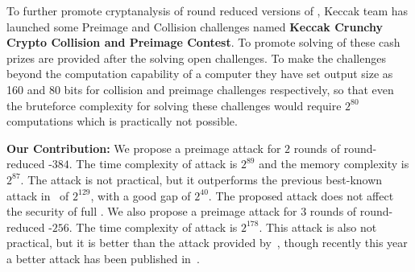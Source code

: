 \newpage
To further promote cryptanalysis of round reduced versions of \KECCAK{}, Keccak team has launched some Preimage and Collision challenges named \textbf{Keccak Crunchy Crypto Collision and Preimage Contest}. To promote solving of these cash prizes are provided after the solving open challenges. To make the challenges beyond the computation capability of a computer they have set output size as 160 and 80 bits for collision and preimage challenges respectively, so that even the bruteforce complexity for solving these challenges would require $2^{80}$ computations which is practically not possible.
\newline

\textbf{Our Contribution:} We propose a preimage attack for $2$ rounds of round-reduced \KECCAK-$384$. The time complexity of attack is $2^{89}$ and the memory complexity is $2^{87}$. The attack is not practical, but it outperforms the previous best-known attack in~\cite{guo2016linear} of $2^{129}$, with a good gap of $2^{40}$. The proposed attack does not affect the security of full \KECCAK{}. We also propose a preimage attack for $3$ rounds of round-reduced \KECCAK-$256$. The time complexity of attack is $2^{178}$. This attack is also not practical, but it is better than the attack provided by~\cite{guo2016linear}, though recently this year a better attack has been published in~\cite{lipreimage}.
